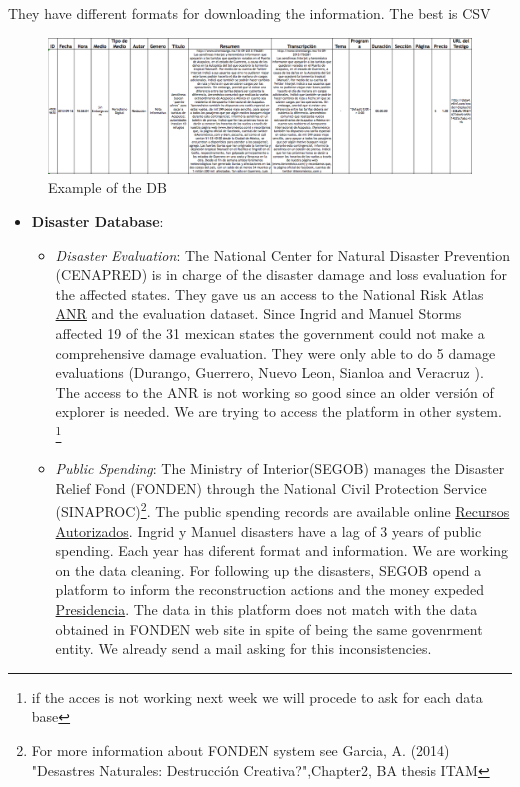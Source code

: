\documentclass[]{article}
\let\rmarkdownfootnote\footnote%
\def\footnote{\protect\rmarkdownfootnote}
\begin{document}
They have different formats for downloading the information. The best is
CSV

\begin{figure}[htbp]
\centering
\includegraphics{img/EI_prueba.png}
\caption{Example of the DB}
\end{figure}

\begin{itemize}
\itemsep1pt\parskip0pt
\item
  \textbf{Disaster Database}:

  \begin{itemize}
  \item
    \emph{Disaster Evaluation}: The National Center for Natural Disaster
    Prevention (CENAPRED) is in charge of the disaster damage and loss
    evaluation for the affected states. They gave us an access to the
    National Risk Atlas
    \href{http://atlasnacionalderiesgos.gob.mx/}{ANR} and the evaluation
    dataset. Since Ingrid and Manuel Storms affected 19 of the 31
    mexican states the government could not make a comprehensive damage
    evaluation. They were only able to do 5 damage evaluations (Durango,
    Guerrero, Nuevo Leon, Sianloa and Veracruz ). The access to the ANR
    is not working so good since an older versión of explorer is needed.
    We are trying to access the platform in other system.
    \footnote{if the acces is not working next week we will procede to ask for each data base}
  \item
    \emph{Public Spending}: The Ministry of Interior(SEGOB) manages the
    Disaster Relief Fond (FONDEN) through the National Civil Protection
    Service
    (SINAPROC)\footnote{For more information about FONDEN system see Garcia, A. (2014) "Desastres Naturales: Destrucción Creativa?",Chapter2, BA thesis ITAM}.
    The public spending records are available online
    \href{http://www.proteccioncivil.gob.mx/es/ProteccionCivil/Recursos_Autorizados_por_Declaratoria_de_Desastre}{Recursos
    Autorizados}. Ingrid y Manuel disasters have a lag of 3 years of
    public spending. Each year has diferent format and information. We
    are working on the data cleaning. For following up the disasters,
    SEGOB opend a platform to inform the reconstruction actions and the
    money expeded
    \href{http://www.presidencia.gob.mx/fonden/}{Presidencia}. The data
    in this platform does not match with the data obtained in FONDEN web
    site in spite of being the same govenrment entity. We already send a
    mail asking for this inconsistencies.
  \end{itemize}
\end{itemize}
\end{document}
